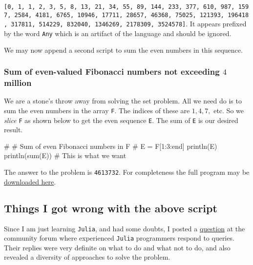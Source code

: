 \documentclass[
  a4paper,
]{article}
\newenvironment{Shaded}{\begin{snugshade}}{\end{snugshade}}
\newcommand{\CommentTok}[1]{\textcolor[rgb]{0.50,0.62,0.50}{#1}}
\newcommand{\FloatTok}[1]{\textcolor[rgb]{0.75,0.75,0.82}{#1}}
\newcommand{\FunctionTok}[1]{\textcolor[rgb]{0.94,0.94,0.56}{#1}}
\newcommand{\KeywordTok}[1]{\textcolor[rgb]{0.94,0.87,0.69}{#1}}
\newcommand{\NormalTok}[1]{\textcolor[rgb]{0.80,0.80,0.80}{#1}}
\newcommand{\OperatorTok}[1]{\textcolor[rgb]{0.94,0.94,0.82}{#1}}
\begin{document}
\texttt{{[}0,\ 1,\ 1,\ 2,\ 3,\ 5,\ 8,\ 13,\ 21,\ 34,\ 55,\ 89,\ 144,\ 233,\ 377,\ 610,\ 987,\ 1597,\ 2584,\ 4181,\ 6765,\ 10946,\ 17711,\ 28657,\ 46368,\ 75025,\ 121393,\ 196418,\ 317811,\ 514229,\ 832040,\ 1346269,\ 2178309,\ 3524578{]}}.
It appears prefixed by the word \texttt{Any} which is an artifact of the
language and should be ignored.

We may now append a second script to sum the even numbers in this
sequence.

\hypertarget{sum-of-even-valued-fibonacci-numbers-not-exceeding-4-million}{%
\subsubsection{\texorpdfstring{Sum of even-valued Fibonacci numbers not
exceeding \(4\)
million}{Sum of even-valued Fibonacci numbers not exceeding 4 million}}\label{sum-of-even-valued-fibonacci-numbers-not-exceeding-4-million}}

We are a stone's throw away from solving the set problem. All we need do
is to sum the even numbers in the array \texttt{F}. The indices of these
are \(1, 4, 7,\) etc. So we \emph{slice} \texttt{F} as shown below to
get the even sequence \texttt{E}. The sum of \texttt{E} is our desired
result.

\begin{Shaded}
\begin{Highlighting}[]
\CommentTok{\#}
\CommentTok{\# Sum of even Fibonacci numbers in F}
\CommentTok{\#}
\NormalTok{E }\OperatorTok{=}\NormalTok{ F[}\FloatTok{1}\OperatorTok{:}\FloatTok{3}\OperatorTok{:}\KeywordTok{end}\NormalTok{]}
\FunctionTok{println}\NormalTok{(E)}
\FunctionTok{println}\NormalTok{(}\FunctionTok{sum}\NormalTok{(E)) }\CommentTok{\# This is what we want}
\end{Highlighting}
\end{Shaded}

The answer to the problem is \texttt{4613732}. For completeness the full
program may be \href{auxiliary/even-sum.jl}{downloaded here}.

\hypertarget{things-i-got-wrong-with-the-above-script}{%
\subsection{Things I got wrong with the above
script}\label{things-i-got-wrong-with-the-above-script}}

Since I am just learning \texttt{Julia}, and had some doubts, I posted a
\href{https://discourse.julialang.org/t/is-it-possible-to-suppres-the-printing-of-any-before-an-array-is-printed/106930}{question}
at the community forum where experienced \texttt{Julia} programmers
respond to queries. Their replies were very definite on what to do and
what not to do, and also revealed a diversity of approaches to solve the
problem.
\end{document}
